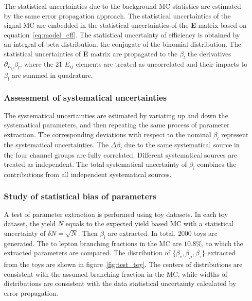 The statistical uncertainties due to the background 
MC statistics are estimated by the same error propagation approach.
The statistical uncertainties of the signal MC are embedded in the statistical uncertainties 
of the \textbf{E} matrix based on equation~\ref{eq:model_eff}. The statistical uncertainty of 
efficiency is obtained by an integral of beta distribution, the conjugate of the
binomial distribution. The statistical uncertainties of \textbf{E} matrix are 
propagated to the $\beta_l$ the derivatives $\partial_{E_{ij}} \beta_l$, where the 
21 $E_{ij}$ elements are treated as uncorrelated and their impacts to $\beta_l$ are 
summed in quadrature. 


\subsubsection{Assessment of systematical uncertainties}

The systematical uncertainties are estimated by variating up and down the systematical parameters, and then
repeating the same process of parameter extraction. The corresponding deviations with respect to the nominal $\beta_l$
represent the systematical uncertainties. The $\Delta \beta_l$ due to the same systematical source in the four
channel groups are fully correlated. Different systematical sources are treated as independent. 
The total systematical uncertainty of $\beta_l$ combines the contributions from all independent systematical sources.


\subsubsection{Study of statistical bias of parameters}
A test of parameter extraction is performed using toy datasets.
In each toy dataset, the yield $N$ equals to the expected yield based MC with 
a statistical uncertainty of $\delta N = \sqrt{N}$. Then $\beta_l$ are 
extracted. In total, 2000 toys are generated. The \PW to lepton branching 
fractions in the MC are $10.8\%$, to which the extracted parameters are compared.
The distribution of $\{\beta_{e},\beta_{\mu},\beta_{\tau}\}$ extracted from the toys are shown in
figure~\ref{fig:test_toy}. The centers of distributions are consistent with
the assumed branching fraction in the MC, while widths of distributions are 
consistent with the data statistical uncertainty calculated by error propagation.





